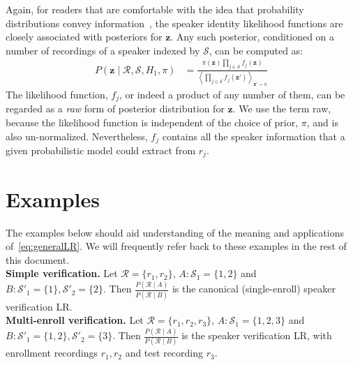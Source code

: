 \documentclass[a4paper,oneside,12pt,english]{report}
\def\zvec{\mathbf{z}}
\def\expvb#1#2{\left\langle#1\right\rangle_{#2}}
\def\Rset{\mathcal{R}}
\def\Sset{\mathcal{S}}
\begin{document}
Again, for readers that are comfortable with the idea that probability distributions convey information~\cite{PTLOS}, the speaker identity likelihood functions are closely associated with posteriors for $\zvec$. Any such posterior, conditioned on a number of recordings of a speaker indexed by $\Sset$, can be computed as:
\begin{align}
P(\zvec\mid \Rset,\Sset,H_1,\pi) &=\frac{\pi(\zvec)\prod_{j\in\Sset}f_j(\zvec)}{\expvb{\prod_{j\in\Sset}f_j(\zvec')}{\zvec'\sim\pi}}
\end{align}
The likelihood function, $f_j$, or indeed a product of any number of them, can be regarded as a \emph{raw} form of posterior distribution for $\zvec$. We use the term raw, because the likelihood function is independent of the choice of prior, $\pi$, and is also un-normalized. Nevertheless, $f_j$ contains all the speaker information that a given probabilistic model could extract from $r_j$.




\section{Examples}
\label{sec:examples}
The examples below should aid understanding of the meaning and applications of~\eqref{eq:generalLR}. We will frequently refer back to these examples in the rest of this document.\\

\noindent\textbf{Simple verification.} Let $\Rset=\{r_1,r_2\}$, $A:\Sset_1=\{1,2\}$ and $B:\Sset'_1=\{1\},\Sset'_2=\{2\}$. Then $\frac{P(\Rset\mid A)}{P(\Rset\mid B)}$ is the canonical (single-enroll) speaker verification LR.\\

\noindent\textbf{Multi-enroll verification.} Let $\Rset=\{r_1,r_2,r_3\}$, $A:\Sset_1=\{1,2,3\}$ and $B:\Sset'_1=\{1,2\},\Sset'_2=\{3\}$. Then $\frac{P(\Rset\mid A)}{P(\Rset\mid B)}$ is the speaker verification LR, with enrollment recordings $r_1,r_2$ and test recording $r_3$.\\
\end{document}
